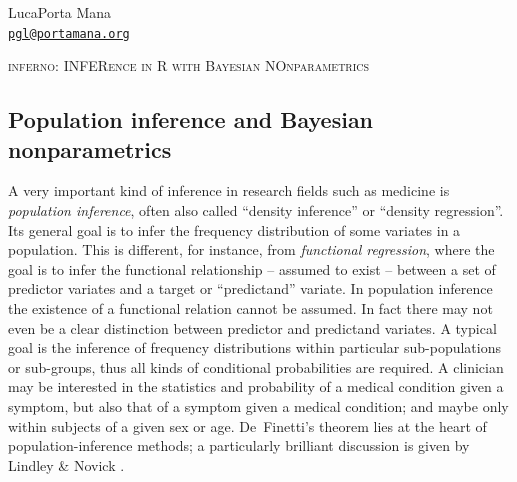 

\newcommand{\citebi}{\cite}
\newcommand{\citein}{\cite}
\newcommand*{\subtitleproc}[1]{}
\newcommand*{\chapb}{}
\providecommand{\doi}[1]{}
\renewcommand{\doi}[1]{\href{https://doi.org/#1}{doi:#1}}
\newcommand*{\osfdoi}[1]{Open Science Framework \doi{#1}}
\newcommand*{\amp}{\&}
\renewcommand*{\P}{\mathrm{P}}%
\renewcommand*{\|}[1][]{\nonscript\:#1\vert\nonscript\:\mathopen{}}
\newcommand*{\mo}[1][=]{\mathclose{}\mathord{\nonscript\mkern0.5mu#1\nonscript\mkern0.5mu}\mathopen{}}
\newcommand*{\yF}{F}
\newcommand*{\yf}{f}
\newcommand*{\di}{\mathop{}\!\mathrm{d}}
\newcommand*{\HV}{\mathrm{HV}}
\newcommand*{\GDS}{\mathrm{GDS}}
\newcommand*{\cAD}{\mathrm{cAD}}
\newcommand*{\yy}{\mathrm{Y}}
\newcommand*{\yn}{\mathrm{N}}


\begin{center}
{\large Luca\enspace Porta Mana} \\
{\tt \href{mailto:pgl@portamana.org}{pgl@portamana.org}}


\Large
\textsc{inferno: INFERence in R with Bayesian NOnparametrics}
\end{center}

\subsection*{Population inference and Bayesian nonparametrics}
\label{sec:popinference}

A very important kind of inference in research fields such as medicine is \emph{population inference}, often also called ``density inference'' or ``density regression''. Its general goal is to infer the frequency distribution of some variates in a population. This is different, for instance, from \emph{functional regression}, where the goal is to infer the functional relationship -- assumed to exist -- between a set of predictor variates and a target or ``predictand'' variate. In population inference the existence of a functional relation cannot be assumed. In fact there may not even be a clear distinction between predictor and predictand variates. A typical goal is the inference of frequency distributions within particular sub-populations or sub-groups, thus all kinds of conditional probabilities are required. A clinician may be interested in the statistics and probability of a medical condition given a symptom, but also that of a symptom given a medical condition; and maybe only within subjects of a given sex or age. De~Finetti's theorem \citep[see e.g.][\S\S\,4.2, 4.3, 4.6]{bernardoetal1994_r2000} lies at the heart of population-inference methods; a particularly brilliant discussion is given by Lindley \& Novick \citeyearpar{lindleyetal1981}.

